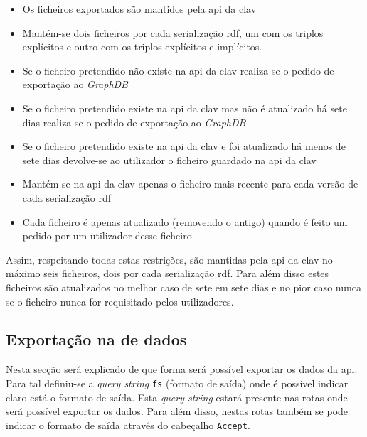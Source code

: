 \begin{itemize}
    \item Os ficheiros exportados são mantidos pela \acrshort{api} da \acrshort{clav}
    \item Mantém-se dois ficheiros por cada serialização \acrshort{rdf}, um com os triplos explícitos e outro com os triplos explícitos e implícitos.
    \item Se o ficheiro pretendido não existe na \acrshort{api} da \acrshort{clav} realiza-se o pedido de exportação ao \textit{GraphDB}
    \item Se o ficheiro pretendido existe na \acrshort{api} da \acrshort{clav} mas não é atualizado há sete dias realiza-se o pedido de exportação ao \textit{GraphDB}
    \item Se o ficheiro pretendido existe na \acrshort{api} da \acrshort{clav} e foi atualizado há menos de sete dias devolve-se ao utilizador o ficheiro guardado na \acrshort{api} da \acrshort{clav}
    \item Mantém-se na \acrshort{api} da \acrshort{clav} apenas o ficheiro mais recente para cada versão de cada serialização \acrshort{rdf}
    \item Cada ficheiro é apenas atualizado (removendo o antigo) quando é feito um pedido por um utilizador desse ficheiro
\end{itemize}

Assim, respeitando todas estas restrições, são mantidas pela \acrshort{api} da \acrshort{clav} no máximo seis ficheiros, dois por cada serialização \acrshort{rdf}. Para além disso estes ficheiros são atualizados no melhor caso de sete em sete dias e no pior caso nunca se o ficheiro nunca for requisitado pelos utilizadores.

\subsection{Exportação na  de dados}
Nesta secção será explicado de que forma será possível exportar os dados da \acrshort{api}. Para tal definiu-se a \textit{query string} \texttt{fs} (formato de saída) onde é possível indicar claro está o formato de saída. Esta \textit{query string} estará presente nas rotas onde será possível exportar os dados. Para além disso, nestas rotas também se pode indicar o formato de saída através do cabeçalho \texttt{Accept}.

